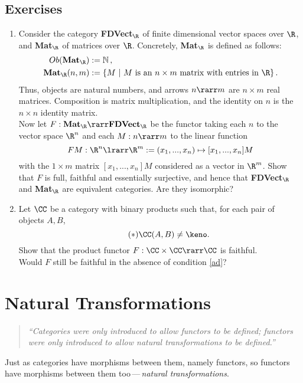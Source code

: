 \documentclass[12pt]{article}
\begin{document}
\subsection{Exercises}\label{ex:Funct}
\begin{enumerate}\renewcommand{\theenumi}{\textbf{\arabic{enumi}}}
  \item Consider the category \textbf{FDVect}$_\R$ of finite dimensional vector spaces over $\R$, and \textbf{Mat}$_\R$ of matrices
        over $\R$. Concretely, \textbf{Mat}$_\R$ is defined as follows:
        \begin{align*}
            Ob(\mathbf{Mat}_\R) &:=\mathbb{N}\,,\\
            \mathbf{Mat}_\R(n,m)&:=\{M\ |\ M\text{ is an $n\times m$ matrix with entries in $\R$}\}\,.
        \end{align*}
        Thus, objects are natural numbers, and arrows $n\rarr m$ are $n\times m$ real matrices.
        Composition is matrix multiplication, and the identity on $n$ is the $n \times n$ identity matrix.
        \\
        Now let $F:\mathbf{Mat}_\R\rarr\mathbf{FDVect}_\R$ be the functor taking each $n$ to the vector space $\R^n$ and each $M:n\rarr m$ to the linear
        function
        \[ FM:\R^n\lrarr\R^m:=(x_1,...,x_n)\mapsto [x_1,...,x_n]M \]
        with the $1\times m$ matrix $[x_1,...,x_n]M$ considered as a vector in $\R^{m}$. Show that $F$ is full, faithful and essentially surjective,
        and hence  that \textbf{FDVect}$_\R$ and \textbf{Mat}$_\R$ are equivalent categories. Are they isomorphic?
  \item Let $\CC$ be a category with binary products such that, for each pair of objects $A,B$,
    \begin{equation}\label{ad}\tag{$*$}
    \CC(A,B)\neq\keno.
    \end{equation}
    Show that the product functor $F:\CC\times\CC\rarr\CC$ is faithful.
    \\ Would $F$ still be faithful in the absence of condition \eqref{ad}?
\end{enumerate}

\section{Natural Transformations}
\begin{quote}\it
``Categories were only introduced to allow functors to be defined;  functors were only introduced to allow natural transformations to be defined.''
\end{quote}
Just as categories have morphisms between them, namely functors, so functors have morphisms between them too\,---\,\emph{natural transformations}.
\end{document}
